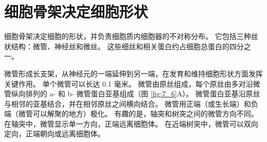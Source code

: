 \section{细胞骨架决定细胞形状}
细胞骨架决定细胞的形状，并负责细胞质内细胞器的不对称分布。 
它包括三种丝状结构：微管、神经丝和微丝。 
这些细丝和相关蛋白约占细胞总蛋白的四分之一。


微管形成长支架，从神经元的一端延伸到另一端，在发育和维持细胞形状方面发挥关键作用。 
单个微管可以长达 0.1 毫米。 
微管由原丝组成，每个原丝由多对沿微管纵向排列的 a- 和 b- 微管蛋白亚基组成（图 \ref{fig:7_6}A）。 
微管蛋白亚基沿原丝与相邻的亚基结合，并在相邻原丝之间横向结合。 
微管用正端（或生长端）和负端（微管可以解聚的地方）极化。 
有趣的是，轴突和树突之间的微管方向不同。 
在轴突中，微管显示单一方向，正端远离细胞体。 
在近端树突中，微管可以双向定向，正端朝向或远离细胞体。

